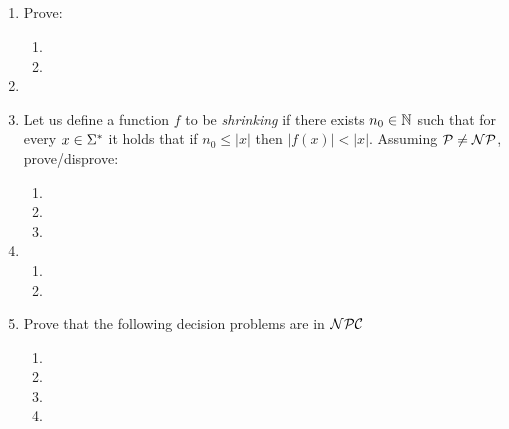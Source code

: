 \documentclass{article}
\title{
    \textmd{\bd{\hmwkClass:\ \hmwkTitle}}\\
}
\author{\hmwkAuthorName}
\begin{document}
\maketitle
\thispagestyle{firststyle}

\begin{enumerate}
      \item Prove:
            \begin{enumerate}
                  \item 
                        \pagebreak
                  \item 
            \end{enumerate}

            \pagebreak

      \item 

            \pagebreak

      \item Let us define a function $f$ to be {\it shrinking} if there exists $n_0 \in \mathbb{N}$ such that
            for every $x \in \Sigma^*$ it holds that if $n_0 \leq |x|$ then $|f(x)| < |x|$.
            Assuming $\mathcal{P} \neq \mathcal{N}\mathcal{P}$, prove/disprove:

            \begin{enumerate}
                  \item 
                  \item 
                        \pagebreak
                  \item 
            \end{enumerate}


      \item
            \begin{enumerate}
                  \item 
                  \item 
            \end{enumerate}

            \pagebreak

      \item Prove that the following decision problems are in $\mathcal{N}\mathcal{P}\mathcal{C}$

            \begin{enumerate}
                  \item 
                        \pagebreak
                  \item 
                        \pagebreak
                  \item 
                        \pagebreak
                  \item 
            \end{enumerate}

            \pagebreak

            
\end{enumerate}
\end{document}
